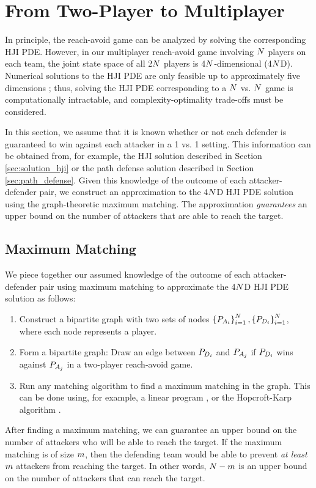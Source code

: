 \section{From Two-Player to Multiplayer} \label{sec:two_to_multi}
In principle, the reach-avoid game can be analyzed by solving the corresponding HJI PDE. However, in our multiplayer reach-avoid game involving $N$ players on each team, the joint state space of all 2$N$ players is 4$N$-dimensional (4$N$D). Numerical solutions to the HJI PDE are only feasible up to approximately five dimensions \cite{HThesis}; thus, solving the HJI PDE corresponding to a $N$ vs. $N$ game is computationally intractable, and complexity-optimality trade-offs must be considered. 

In this section, we assume that it is known whether or not each defender is guaranteed to win against each attacker in a 1 vs. 1 setting. This information can be obtained from, for example, the HJI solution described in Section \ref{sec:solution_hji} or the path defense solution described in Section \ref{sec:path_defense}. Given this knowledge of the outcome of each attacker-defender pair, we construct an approximation to the 4$N$D HJI PDE solution using the graph-theoretic maximum matching. The approximation \textit{guarantees} an upper bound on the number of attackers that are able to reach the target. 

\subsection{Maximum Matching}
\label{subsec:max_match}
We piece together our assumed knowledge of the outcome of each attacker-defender pair using maximum matching to approximate the 4$N$D HJI PDE solution as follows:

\begin{enumerate}
\item Construct a bipartite graph with two sets of nodes $\left\{P_{A_{i}}\right\}_{i=1}^N,\left\{P_{D_{i}}\right\}_{i=1}^N$, where each node represents a player.
\item Form a bipartite graph: Draw an edge between $P_{D_{i}}$ and $P_{A_{j}}$ if $P_{D_{i}}$ wins against $P_{A_{j}}$ in a two-player reach-avoid game.
\item Run any matching algorithm to find a maximum matching in the graph. This can be done using, for example, a linear program \cite{Schrjiver2004}, or the Hopcroft-Karp algorithm \cite{Karpinski1998}.
\end{enumerate}

After finding a maximum matching, we can guarantee an upper bound on the number of attackers who will be able to reach the target. If the maximum matching is of size $m$, then the defending team would be able to prevent \textit{at least} $m$ attackers from reaching the target. In other words, $N-m$ is an upper bound on the number of attackers that can reach the target.


